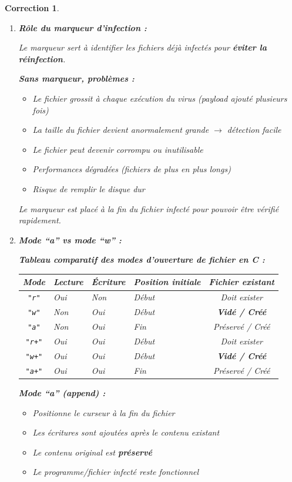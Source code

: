 \documentclass[a4paper,11pt]{article}
\theoremstyle{plain}
\newtheorem{correction}{Correction}
\theoremstyle{definition}
\begin{document}
\begin{correction}

\begin{enumerate}
\item \textbf{Rôle du marqueur d'infection :}

Le marqueur sert à identifier les fichiers déjà infectés pour \textbf{éviter la réinfection}.

\textbf{Sans marqueur, problèmes :}
\begin{itemize}
\item Le fichier grossit à chaque exécution du virus (payload ajouté plusieurs fois)
\item La taille du fichier devient anormalement grande $\rightarrow$ détection facile
\item Le fichier peut devenir corrompu ou inutilisable
\item Performances dégradées (fichiers de plus en plus longs)
\item Risque de remplir le disque dur
\end{itemize}

Le marqueur est placé à la fin du fichier infecté pour pouvoir être vérifié rapidement.

\item \textbf{Mode ``a'' vs mode ``w'' :}

\textbf{Tableau comparatif des modes d'ouverture de fichier en C :}

\medskip
\begin{center}
\begin{tabular}{c|p{2.5cm}|p{2.5cm}|p{2.5cm}|c}
\toprule
\textbf{Mode} & \textbf{Lecture} & \textbf{Écriture} & \textbf{Position initiale} & \textbf{Fichier existant} \\
\midrule
\texttt{"r"}  & Oui & Non & Début & Doit exister \\
\texttt{"w"}  & Non & Oui & Début & \textbf{Vidé / Créé} \\
\texttt{"a"}  & Non & Oui & Fin   & Préservé / Créé \\
\texttt{"r+"} & Oui & Oui & Début & Doit exister \\
\texttt{"w+"} & Oui & Oui & Début & \textbf{Vidé / Créé} \\
\texttt{"a+"} & Oui & Oui & Fin   & Préservé / Créé \\
\bottomrule
\end{tabular}
\end{center}

\medskip
\textbf{Mode ``a'' (append) :}
\begin{itemize}
\item Positionne le curseur à la fin du fichier
\item Les écritures sont ajoutées après le contenu existant
\item Le contenu original est \textbf{préservé}
\item Le programme/fichier infecté reste fonctionnel
\end{itemize}


\end{enumerate}
\end{correction}
\end{document}
